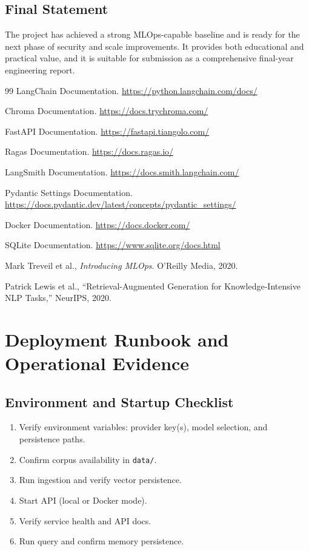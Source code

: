 \documentclass[12pt,letterpaper]{report}
\begin{document}
\section{Final Statement}
The project has achieved a strong MLOps-capable baseline and is ready for the next phase of security and scale improvements. It provides both educational and practical value, and it is suitable for submission as a comprehensive final-year engineering report.

\begin{thebibliography}{99}
LangChain Documentation. \url{https://python.langchain.com/docs/}

Chroma Documentation. \url{https://docs.trychroma.com/}

FastAPI Documentation. \url{https://fastapi.tiangolo.com/}

Ragas Documentation. \url{https://docs.ragas.io/}

LangSmith Documentation. \url{https://docs.smith.langchain.com/}

Pydantic Settings Documentation. \url{https://docs.pydantic.dev/latest/concepts/pydantic_settings/}

Docker Documentation. \url{https://docs.docker.com/}

SQLite Documentation. \url{https://www.sqlite.org/docs.html}

Mark Treveil et al., \textit{Introducing MLOps}. O'Reilly Media, 2020.

Patrick Lewis et al., ``Retrieval-Augmented Generation for Knowledge-Intensive NLP Tasks,'' NeurIPS, 2020.
\end{thebibliography}

\appendix

\chapter{Deployment Runbook and Operational Evidence}

\section{Environment and Startup Checklist}
\begin{enumerate}
\item Verify environment variables: provider key(s), model selection, and persistence paths.
\item Confirm corpus availability in \texttt{data/}.
\item Run ingestion and verify vector persistence.
\item Start API (local or Docker mode).
\item Verify service health and API docs.
\item Run query and confirm memory persistence.
\end{enumerate}
\end{document}
